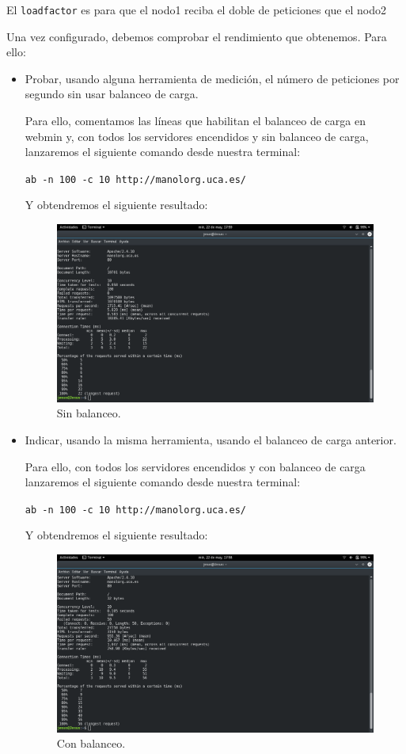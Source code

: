 \documentclass[12pt,letterpaper]{article}
\begin{document}
El \texttt{loadfactor} es para que el nodo1 reciba el doble de peticiones que el nodo2

Una vez configurado, debemos comprobar el rendimiento que obtenemos. Para ello:
\begin{itemize}
	\item Probar, usando alguna herramienta de medición, el número de peticiones por segundo sin usar balanceo de carga.
	
	Para ello, comentamos las líneas que habilitan el balanceo de carga en webmin y, con todos los servidores encendidos y sin balanceo de carga, lanzaremos el siguiente comando desde nuestra terminal:
	\begin{center}
		\texttt{ab -n 100 -c 10 http://manolorg.uca.es/}
	\end{center}

	Y obtendremos el siguiente resultado:
	\begin{figure}[h]
		\centering
		\includegraphics[scale=0.34]{SinBalanceo.png}
		\caption{Sin balanceo.}
		\label{Sin balanceo}
	\end{figure}

	\item Indicar, usando la misma herramienta, usando el balanceo de carga anterior.
	
	Para ello, con todos los servidores encendidos y con balanceo de carga lanzaremos el siguiente comando desde nuestra terminal:
	\begin{center}
		\texttt{ab -n 100 -c 10 http://manolorg.uca.es/}
	\end{center}
	Y obtendremos el siguiente resultado:
	\begin{figure}[h]
		\centering
		\includegraphics[scale=0.34]{ConBalanceo.png}
		\caption{Con balanceo.}
		\label{Con balanceo}
	\end{figure}
\end{itemize}
\end{document}
